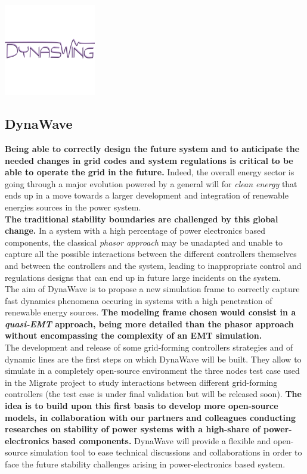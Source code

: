 \documentclass[a4paper, 12pt]{report}
\begin{document}
\begin{center}
\includegraphics[width=0.3\textwidth]{../resources/DynaSwing.png}
\end{center}

\newpage
\subsection{DynaWave}

\textbf{Being able to correctly design the future system and to anticipate the needed changes in grid codes and system regulations is critical to be able to operate the grid in the future.} Indeed, the overall energy sector is going through a major evolution powered by a general will for \textit{clean energy} that ends up in a move towards a larger development and integration of renewable energies sources in the power system. \\

\textbf{The traditional stability boundaries are challenged by this global change.} In a system with a high percentage of power electronics based components, the classical \textit{phasor approach} may be unadapted and unable to capture all the possible interactions between the different controllers themselves and between the controllers and the system, leading to inappropriate control and regulations designs that can end up in future large incidents on the system. \\

The aim of DynaWave is to propose a new simulation frame to correctly capture fast dynamics phenomena occuring in systems with a high penetration of renewable energy sources. \textbf{The modeling frame chosen would consist in a \textit{quasi-EMT} approach, being more detailed than the phasor approach without encompassing the complexity of an EMT simulation.} \\

The development and release of some grid-forming controllers strategies and of dynamic lines are the first steps on which DynaWave will be built. They allow to simulate in a completely open-source environment the three nodes test case used in the Migrate project to study interactions between different grid-forming controllers (the test case is under final validation but will be released soon). \textbf{The idea is to build upon this first basis to develop more open-source models, in collaboration with our partners and colleagues conducting researches on stability of power systems with a high-share of power-electronics based components.} DynaWave will provide a flexible and open-source simulation tool to ease technical discussions and collaborations in order to face the future stability challenges arising in power-electronics based system.
\end{document}
